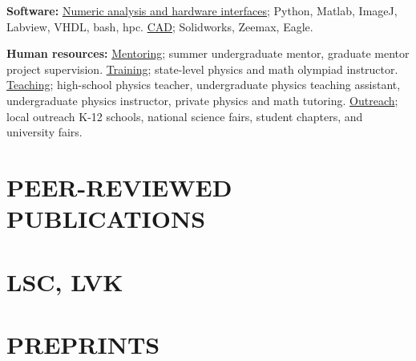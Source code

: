 \documentclass[margin]{res} %
\begin{document}
\begin{resume}
{\bf Software:} 
{\underline{Numeric analysis and hardware interfaces};} Python, Matlab, ImageJ, Labview, VHDL, bash, hpc. {\underline{CAD};} Solidworks, Zeemax, Eagle.

{\bf Human resources:}
{\underline{Mentoring}; summer undergraduate mentor, graduate mentor project supervision. {\underline{Training};} state-level physics and math olympiad instructor. {\underline{Teaching};} high-school physics teacher, undergraduate physics teaching assistant, undergraduate physics instructor, private physics and math tutoring. {\underline{Outreach};} local outreach K-12 schools, national science fairs, student chapters, and university fairs.}

\end{resume}

\section{PEER-REVIEWED PUBLICATIONS}

\nocite{*}

\printbibliography[heading=none, keyword={peer}]

\section{LSC, LVK}

\nocite{*}

\printbibliography[heading=none, keyword={lsc}]

\section{PREPRINTS}

\nocite{*}

\printbibliography[heading=none, keyword={npeer}]
\end{document}
